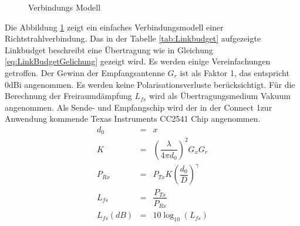 \begin{figure}[h]
\begin{center}
\end{center}
\caption{Verbindungs Modell}
\label{fig:LinkModell}
\end{figure}

Die Abbildung \ref{fig:LinkModell} zeigt ein einfaches Verbindungsmodell einer Richtstrahlverbindung. Das in der Tabelle \ref{tab:Linkbudget} aufgezeigte Linkbudget beschreibt eine Übertragung wie in Gleichung \ref{eq:LinkBudgetGelichung} gezeigt wird. Es werden einige Vereinfachungen getroffen. Der Gewinn der Empfangsantenne $G_{r}$  ist als Faktor 1, das entspricht 0dBi angenommen. Es werden keine Polarisationsverluste berücksichtigt. Für die Berechnung der Freiraumdämpfung $L_{fs}$ wird als Übertragungsmedium Vakuum angenommen. Als Sende- und Empfangschip wird der in der \glqq Connect 1\grqq zur Anwendung kommende Texas Instruments CC2541 Chip angenommen.
\begin{eqnarray}
    	d_{0} 	&=& x \\ \label{eq:d0_LinkBudget}
    K		&=& \left(\dfrac{\lambda}{4\pi d_{0}} \right)^{2}G_{x}G_{r} \\ \label{eq:K_LinkBudget}
    P_{Rx} 	&=& P_{Tx}K \left( \dfrac{d_{0}}{D}\right)^{\gamma} \\ \label{eq:Prx_LinkBudget}
    L_{fs} 	&=& \dfrac{P_{Tx}}{P_{Rx}} \\ \label{eq:Freiraumdaempfung}
    L_{fs}(dB) 	&=& 10\log_{10}(L_{fs}) \label{eq:Freiraumdaempfung_dB}
\end{eqnarray}


